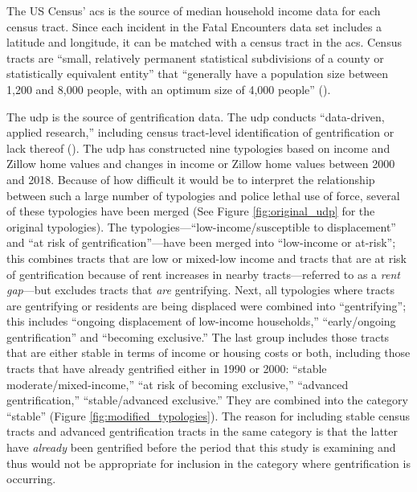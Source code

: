 \documentclass[12pt]{article}
\begin{document}
The US Census’ \acrfull{acs} is the source of median household income data for each census tract. Since each incident in the Fatal Encounters data set includes a latitude and longitude, it can be matched with a census tract in the \acrshort{acs}. Census tracts are “small, relatively permanent statistical subdivisions of a county or statistically equivalent entity” that “generally have a population size between 1,200 and 8,000 people, with an optimum size of 4,000 people” (\cite{bureauGlossary}).

The \acrfull{udp} is the source of gentrification data. The \acrshort{udp} conducts “data-driven, applied research,” including census tract-level identification of gentrification or lack thereof (\cite{udpDisplacementGentrificationTypologies2023}). The \acrshort{udp} has constructed nine typologies based on income and Zillow home values and changes in income or Zillow home values between 2000 and 2018. Because of how difficult it would be to interpret the relationship between such a large number of typologies and police lethal use of force, several of these typologies have been merged (See Figure \ref{fig:original_udp} for the original typologies). The typologies—“low-income/susceptible to displacement” and “at risk of gentrification”—have been merged into “low-income or at-risk”; this combines tracts that are low or mixed-low income and tracts that are at risk of gentrification because of rent increases in nearby tracts—referred to as a \textit{rent gap}—but excludes tracts that \textit{are} gentrifying. Next, all typologies where tracts are gentrifying or residents are being displaced were combined into “gentrifying”; this includes “ongoing displacement of low-income households,” “early/ongoing gentrification” and “becoming exclusive.” The last group includes those tracts that are either stable in terms of income or housing costs or both, including those tracts that have already gentrified either in 1990 or 2000: “stable moderate/mixed-income,” “at risk of becoming exclusive,” “advanced gentrification,” “stable/advanced exclusive.” They are combined into the category “stable” (Figure \ref{fig:modified_typologies}). The reason for including stable census tracts and advanced gentrification tracts in the same category is that the latter have \textit{already} been gentrified before the period that this study is examining and thus would not be appropriate for inclusion in the category where gentrification is occurring.
\end{document}
